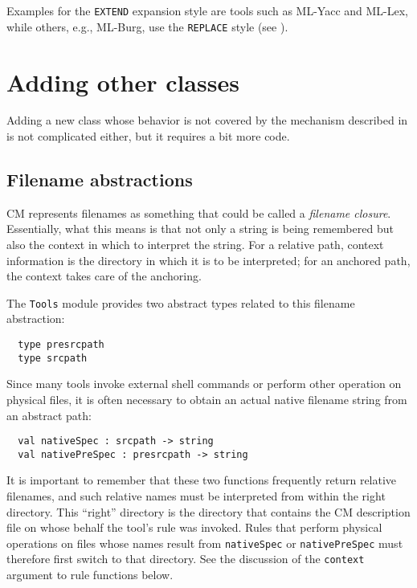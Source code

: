 Examples for the {\tt EXTEND} expansion style are tools such as
ML-Yacc and ML-Lex, while others, e.g., ML-Burg, use the {\tt REPLACE}
style (see ).

\section{Adding other classes}

Adding a new class whose behavior is not covered by the mechanism
described in  is not complicated
either, but it requires a bit more code.

\subsection{Filename abstractions}

CM represents filenames as something that could be called a {\em
filename closure}.  Essentially, what this means is that not only a
string is being remembered but also the context in which to interpret
the string.  For a relative path, context information is the directory
in which it is to be interpreted; for an anchored path, the context
takes care of the anchoring.

The {\tt Tools} module provides two abstract types related to this
filename abstraction:

\begin{lstlisting}
  type presrcpath
  type srcpath
\end{lstlisting}%

Since many tools invoke external shell commands or perform other
operation on physical files, it is often necessary to obtain an actual
native filename string from an abstract path:

\begin{lstlisting}
  val nativeSpec : srcpath -> string
  val nativePreSpec : presrcpath -> string
\end{lstlisting}%

It is important to remember that these two functions frequently return
relative filenames, and such relative names must be interpreted from
within the right directory.  This ``right'' directory is the directory
that contains the CM description file on whose behalf the tool's rule
was invoked.  Rules that perform physical operations on files whose
names result from {\tt nativeSpec} or {\tt nativePreSpec} must
therefore first switch to that directory.  See the discussion of the
{\tt context} argument to rule functions below.

